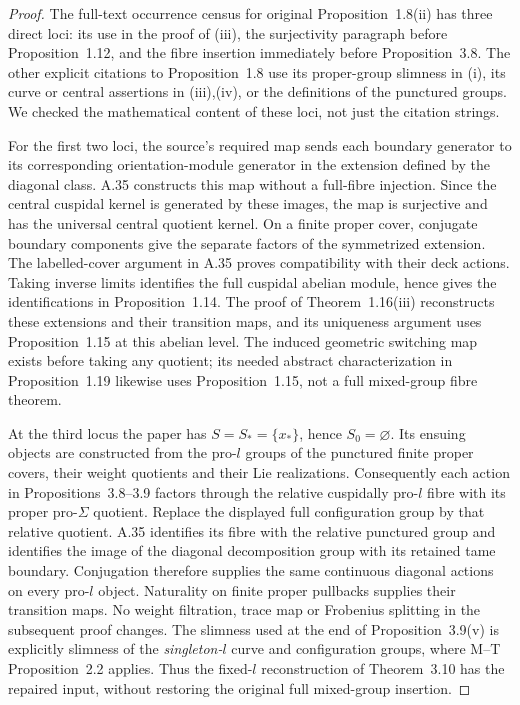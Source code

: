 \documentclass[11pt,a4paper]{article}
\begin{document}
\begin{proof}
The full-text occurrence census for original Proposition~1.8(ii)
has three direct loci: its use in the proof of (iii), the
surjectivity paragraph before Proposition~1.12, and the fibre
insertion immediately before Proposition~3.8. The other explicit
citations to Proposition~1.8 use its proper-group slimness in
(i), its curve or central assertions in (iii),(iv), or the
definitions of the punctured groups. We checked the mathematical
content of these loci, not just the citation strings.

For the first two loci, the source's required map sends each
boundary generator to its corresponding orientation-module
generator in the extension defined by the diagonal class.
A.35 constructs this map without a full-fibre injection. Since
the central cuspidal kernel is generated by these images, the
map is surjective and has the universal central quotient kernel.
On a finite proper cover, conjugate boundary components give the
separate factors of the symmetrized extension. The labelled-cover
argument in A.35 proves compatibility with their deck actions.
Taking inverse limits identifies the full cuspidal abelian
module, hence gives the identifications in Proposition~1.14.
The proof of Theorem~1.16(iii) reconstructs these extensions and
their transition maps, and its uniqueness argument uses
Proposition~1.15 at this abelian level. The induced geometric
switching map exists before taking any quotient; its needed
abstract characterization in Proposition~1.19 likewise uses
Proposition~1.15, not a full mixed-group fibre theorem.

At the third locus the paper has $S=S_* =\{x_*\}$, hence
$S_0=\varnothing$. Its ensuing objects are constructed from the
pro-$l$ groups of the punctured finite proper covers, their
weight quotients and their Lie realizations. Consequently each
action in Propositions~3.8--3.9 factors through the relative
cuspidally pro-$l$ fibre with its proper pro-$\Sigma$ quotient.
Replace the displayed full configuration group by that relative
quotient. A.35 identifies its fibre with the relative
punctured group and identifies the image of the diagonal
decomposition group with its retained tame boundary. Conjugation
therefore supplies the same continuous diagonal actions on every
pro-$l$ object. Naturality on finite proper pullbacks supplies
their transition maps. No weight filtration, trace map or
Frobenius splitting in the subsequent proof changes. The
slimness used at the end of Proposition~3.9(v) is explicitly
slimness of the \emph{singleton-$l$} curve and configuration
groups, where M--T Proposition~2.2 applies. Thus the fixed-$l$
reconstruction of Theorem~3.10 has the repaired input, without
restoring the original full mixed-group insertion.


\end{proof}
\end{document}
